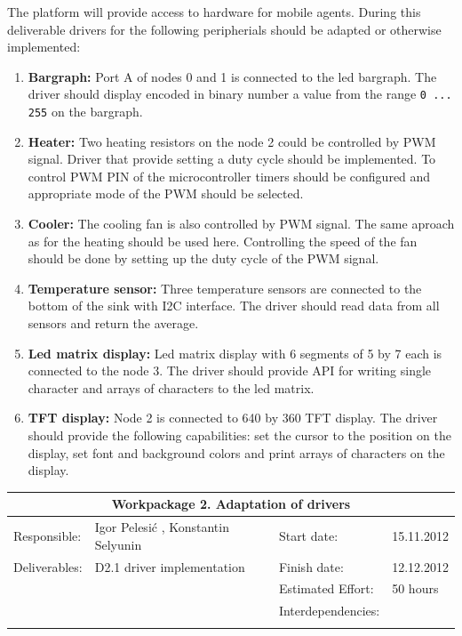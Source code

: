 \documentclass{scrreprt}
\begin{document}
The platform will provide access to hardware for mobile agents.
During this deliverable drivers for the following peripherials should be adapted or otherwise implemented:
\begin{enumerate}

\item{\textbf{Bargraph:} Port A of nodes 0 and 1 is connected to the led bargraph.
The driver should display encoded in binary number a value from the range \texttt{0 ... 255} on the bargraph.
}


\item{\textbf{Heater:} Two heating resistors on the node 2 could be controlled by PWM signal.
Driver that provide setting a duty cycle should be implemented.
To control PWM PIN of the microcontroller timers should be configured and appropriate mode of the PWM should be selected.
}

\item{\textbf{Cooler:} The cooling fan is also controlled by PWM signal.
The same aproach as for the heating should be used here.
Controlling the speed of the fan should be done by setting up the duty cycle of the PWM signal.
}

\item{\textbf{Temperature sensor:} 
Three temperature sensors are connected to the bottom of the sink with I2C interface.
The driver should read data from all sensors and return the average.
}

\item{\textbf{Led matrix display:} 
Led matrix display with 6 segments of 5 by 7 each is connected to the node 3.
The driver should provide API for writing single character and arrays of characters to the led matrix.
}

\item{\textbf{TFT display:} 
Node 2 is connected to 640 by 360 TFT display.
The driver should provide the following capabilities: 
set the cursor to the position on the display,
set font and background colors and print arrays of characters on the display.
}
\end{enumerate}

\vspace{0.2in}
\begin{tabular}{|ll|ll|}
\hline \multicolumn{4}{|c|}{\textbf{Workpackage 2. Adaptation of drivers}}\\
\hline
Responsible:	&  Igor Pelesi\'c , Konstantin Selyunin	& Start date:		& 15.11.2012 \\
Deliverables:	&  D2.1 driver implementation		& Finish date:	 	& 12.12.2012\\
		&  					& Estimated Effort: 	& 50 hours \\
		&  					& Interdependencies:	& 	\\
		&  					& 			& 	\\
\hline
\end{tabular}
\end{document}
